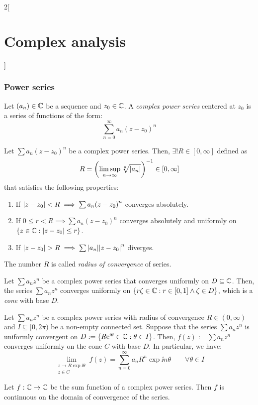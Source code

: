 \documentclass[../../../main_math.tex]{subfiles}
\begin{document}
\begin{multicols}{2}[\section{Complex analysis}]
  \subsubsection{Power series}
  \begin{definition}
    Let $(a_n)\in\mathbb{C}$ be a sequence and $z_0\in\mathbb{C}$. A \emph{complex power series} centered at $z_0$ is a series of functions of the form: $$\sum_{n=0}^\infty a_n{(z-z_0)}^n$$
  \end{definition}
  \begin{theorem}
    Let $\sum a_n{(z-z_0)}^n$ be a complex power series. Then, $\exists! R\in[0,\infty]$ defined as $$R=\left(\limsup_{n\to\infty}\sqrt[n]{\abs{a_n}}\right)^{-1}\in[0,\infty]$$
    that satisfies the following properties:
    \begin{enumerate}
      \item If $\abs{z-z_0}<R\implies\sum a_n{(z-z_0)}^n$ converges absolutely.
      \item If $0\leq r<R\implies\sum a_n{(z-z_0)}^n$ converges absolutely and uniformly on $\{z\in\mathbb{C}:\abs{z-z_0}\leq r\}$.
      \item If $\abs{z-z_0}>R\implies\sum\abs{a_n}{\abs{z-z_0}}^n$ diverges.
    \end{enumerate}
    The number $R$ is called \emph{radius of convergence} of series.
  \end{theorem}
  \begin{theorem}
    Let $\sum a_n{z}^n$ be a complex power series that converges uniformly on $D\subseteq \mathbb{C}$. Then, the series $\sum a_n{z}^n$ converges uniformly on $\{r\zeta\in\mathbb{C}:r\in[0,1]\land\zeta\in D\}$, which is a \emph{cone} with base $D$.
  \end{theorem}
  \begin{corollary}
    Let $\sum a_n{z}^n$ be a complex power series with radius of convergence $R\in(0,\infty)$ and $I\subseteq [0,2\pi)$ be a non-empty connected set. Suppose that the series $\sum a_n{z}^n$ is uniformly convergent on $D:=\{R\mathrm{e}^{\mathrm{i} \theta}\in\mathbb{C}: \theta\in I\}$. Then, $f(z):=\sum a_n{z}^n$ converges uniformly on the cone $C$ with base $D$. In particular, we have: $$\lim_{\substack{z\to R\exp{\ii \theta}\\z\in C}}f(z)=\sum_{n=0}^\infty a_nR^n\exp{\ii n\theta}\qquad\forall\theta\in I$$
  \end{corollary}
  \begin{proposition}
    Let $f:\mathbb{C}\rightarrow\mathbb{C}$ be the sum function of a complex power series. Then $f$ is continuous on the domain of convergence of the series.
  \end{proposition}

\end{multicols}
\end{document}
